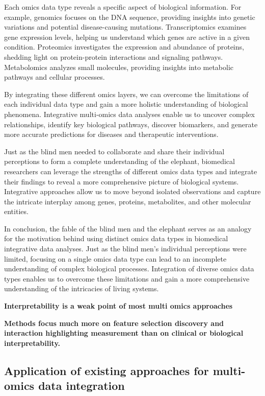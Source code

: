 \documentclass[a4paper, nobind]{templates/ociamthesis}
\begin{document}
Each omics data type reveals a specific aspect of biological information. For example, genomics focuses on the DNA sequence, providing insights into genetic variations and potential disease-causing mutations. Transcriptomics examines gene expression levels, helping us understand which genes are active in a given condition. Proteomics investigates the expression and abundance of proteins, shedding light on protein-protein interactions and signaling pathways. Metabolomics analyzes small molecules, providing insights into metabolic pathways and cellular processes.

By integrating these different omics layers, we can overcome the limitations of each individual data type and gain a more holistic understanding of biological phenomena. Integrative multi-omics data analyses enable us to uncover complex relationships, identify key biological pathways, discover biomarkers, and generate more accurate predictions for diseases and therapeutic interventions.

Just as the blind men needed to collaborate and share their individual perceptions to form a complete understanding of the elephant, biomedical researchers can leverage the strengths of different omics data types and integrate their findings to reveal a more comprehensive picture of biological systems. Integrative approaches allow us to move beyond isolated observations and capture the intricate interplay among genes, proteins, metabolites, and other molecular entities.

In conclusion, the fable of the blind men and the elephant serves as an analogy for the motivation behind using distinct omics data types in biomedical integrative data analyses. Just as the blind men's individual perceptions were limited, focusing on a single omics data type can lead to an incomplete understanding of complex biological processes. Integration of diverse omics data types enables us to overcome these limitations and gain a more comprehensive understanding of the intricacies of living systems.

\textbf{Interpretability is a weak point of most multi omics approaches}

\textbf{Methods focus much more on feature selection discovery and interaction highlighting measurement than on clinical or biological interpretability.}

\hypertarget{application-of-existing-approaches-for-multi-omics-data-integration}{%
\subsection{Application of existing approaches for multi-omics data integration}\label{application-of-existing-approaches-for-multi-omics-data-integration}}
\end{document}
